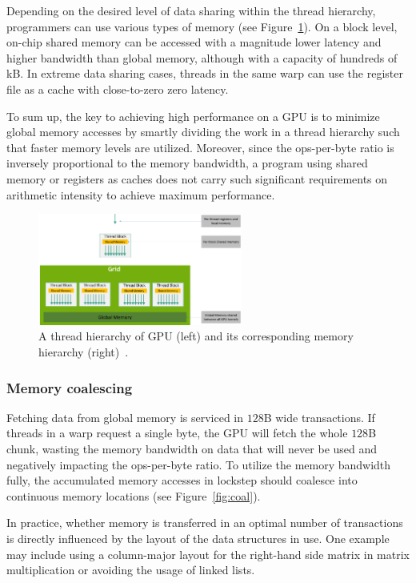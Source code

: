 Depending on the desired level of data sharing within the thread hierarchy, programmers can use various types of memory (see Figure~\ref{fig:mem-hierarchy}). On a block level, on-chip shared memory can be accessed with a magnitude lower latency and higher bandwidth than global memory, although with a capacity of hundreds of kB. In extreme data sharing cases, threads in the same warp can use the register file as a cache with close-to-zero zero latency.

To sum up, the key to achieving high performance on a GPU is to minimize global memory accesses by smartly dividing the work in a thread hierarchy such that faster memory levels are utilized. Moreover, since the ops-per-byte ratio is inversely proportional to the memory bandwidth, a program using shared memory or registers as caches does not carry such significant requirements on arithmetic intensity to achieve maximum performance.

\begin{figure}
    \centering
    \includegraphics[width=0.6\textwidth]{img/mem-hierarchy-2.png}
    \caption{A thread hierarchy of GPU (left) and its corresponding memory hierarchy (right)~\cite{site:cuda}.}
    \label{fig:mem-hierarchy}
\end{figure}

\subsubsection{Memory coalescing}
\label{sec:coalescing}

Fetching data from global memory is serviced in $128$B wide transactions. If threads in a warp request a single byte, the GPU will fetch the whole $128$B chunk, wasting the memory bandwidth on data that will never be used and negatively impacting the ops-per-byte ratio. To utilize the memory bandwidth fully, the accumulated memory accesses in lockstep should coalesce into continuous memory locations (see Figure~\ref{fig:coal}).

In practice, whether memory is transferred in an optimal number of transactions is directly influenced by the layout of the data structures in use. One example may include using a column-major layout for the right-hand side matrix in matrix multiplication or avoiding the usage of linked lists.

